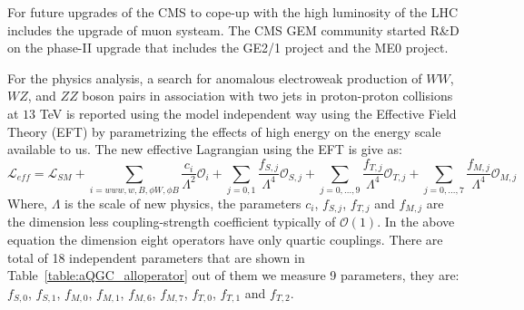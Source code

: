 For future upgrades of the CMS to cope-up with the high luminosity of the LHC includes the upgrade of muon systeam. The CMS GEM community started R\&D on the phase-II upgrade that includes the GE2/1 project and the ME0 project.

For the physics analysis, a search for anomalous electroweak production of $WW$, $WZ$, and $ZZ$ boson pairs in association with two jets in proton-proton collisions at $13$ TeV is reported using the model independent way using the Effective Field Theory (EFT) by parametrizing the effects of high energy on the energy scale available to us. The new effective Lagrangian using the EFT is give as:
\begin{equation}
	\mathcal{L}_{eff} = \mathcal{L}_{SM} + \sum_{i=www,w,B, \phi W, \phi B} \frac{c_i}{\Lambda^2} {\mathcal{O}}_i + \sum_{j=0,1}\frac{f_{S,j}}{\Lambda^4} \mathcal{O}_{S,j} + \sum_{j=0,...,9}\frac{f_{T,j}}{\Lambda^4} \mathcal{O}_{T,j}  + \sum_{j=0,...,7} \frac{f_{M,j}}{\Lambda^4} \mathcal{O}_{M,j}
\end{equation}
Where, $\Lambda$ is the scale of new physics, the parameters $c_i$, $f_{S,j}$, $f_{T,j}$ and $f_{M,j}$ are the dimension less coupling-strength coefficient typically of $\mathcal{O}(1)$. In the above equation the dimension eight operators have only quartic couplings. There are total of 18 independent parameters that are shown in Table~\ref{table:aQGC_alloperator} out of them we measure 9 parameters, they are: $f_{S,0}$, $f_{S,1}$, $f_{M,0}$, $f_{M,1}$, $f_{M,6}$, $f_{M,7}$, $f_{T,0}$, $f_{T,1}$ and $f_{T,2}$. 
